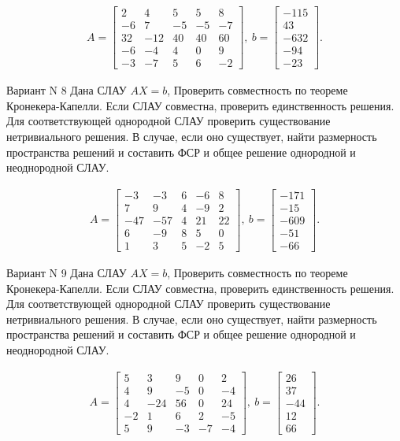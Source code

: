 \documentclass[11pt]{report}
\begin{document}
\begin{align*}
 A = \left[\begin{matrix}2 & 4 & 5 & 5 & 8\\-6 & 7 & -5 & -5 & -7\\32 & -12 & 40 & 40 & 60\\-6 & -4 & 4 & 0 & 9\\-3 & -7 & 5 & 6 & -2\end{matrix}\right],
\ b = \left[\begin{matrix}-115\\43\\-632\\-94\\-23\end{matrix}\right]. 
 \end{align*}

Вариант N 8
Дана СЛАУ $AX = b$,
Проверить совместность по теореме Кронекера-Капелли. Если СЛАУ совместна, проверить единственность решения.
Для соответствующей однородной СЛАУ проверить существование нетривиального решения. В случае, если оно существует,
найти размерность пространства решений и составить ФСР и общее решение однородной  и неоднородной СЛАУ.


\begin{align*}
 A = \left[\begin{matrix}-3 & -3 & 6 & -6 & 8\\7 & 9 & 4 & -9 & 2\\-47 & -57 & 4 & 21 & 22\\6 & -9 & 8 & 5 & 0\\1 & 3 & 5 & -2 & 5\end{matrix}\right],
\ b = \left[\begin{matrix}-171\\-15\\-609\\-51\\-66\end{matrix}\right]. 
 \end{align*}

Вариант N 9
Дана СЛАУ $AX = b$,
Проверить совместность по теореме Кронекера-Капелли. Если СЛАУ совместна, проверить единственность решения.
Для соответствующей однородной СЛАУ проверить существование нетривиального решения. В случае, если оно существует,
найти размерность пространства решений и составить ФСР и общее решение однородной  и неоднородной СЛАУ.


\begin{align*}
 A = \left[\begin{matrix}5 & 3 & 9 & 0 & 2\\4 & 9 & -5 & 0 & -4\\4 & -24 & 56 & 0 & 24\\-2 & 1 & 6 & 2 & -5\\5 & 9 & -3 & -7 & -4\end{matrix}\right],
\ b = \left[\begin{matrix}26\\37\\-44\\12\\66\end{matrix}\right]. 
 \end{align*}
\end{document}

